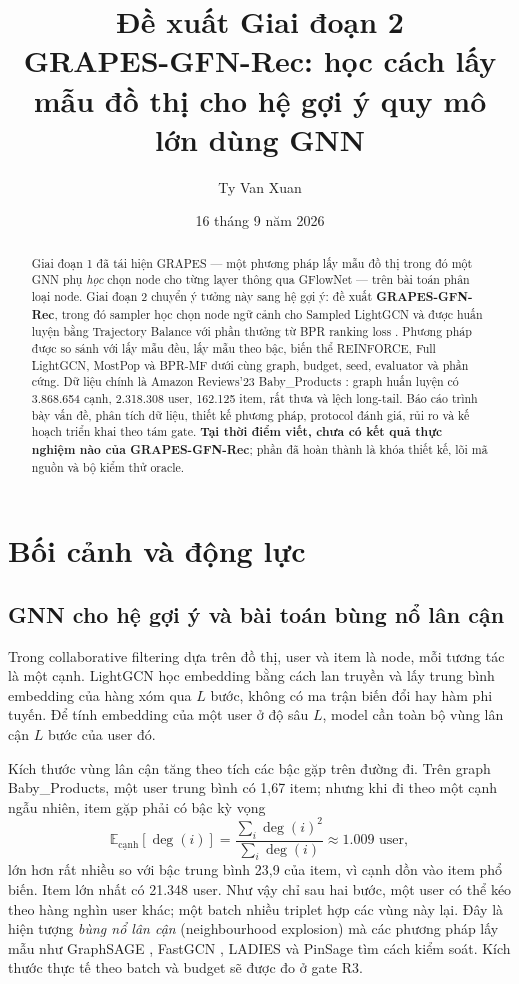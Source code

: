 \documentclass[11pt,a4paper]{article}
\title{\textbf{Đề xuất Giai đoạn 2}\\[4pt]\Large GRAPES-GFN-Rec: học cách lấy mẫu đồ thị cho hệ gợi ý quy mô lớn dùng GNN}
\author{Ty Van Xuan}
\date{16 tháng 9 năm 2026}
\begin{document}
\maketitle

\begin{abstract}
\noindent Giai đoạn 1 đã tái hiện GRAPES \cite{grapes} — một phương pháp lấy mẫu đồ thị trong đó một GNN phụ \emph{học} chọn node cho từng layer thông qua GFlowNet — trên bài toán phân loại node. Giai đoạn 2 chuyển ý tưởng này sang hệ gợi ý: đề xuất \textbf{GRAPES-GFN-Rec}, trong đó sampler học chọn node ngữ cảnh cho Sampled LightGCN \cite{lightgcn} và được huấn luyện bằng Trajectory Balance \cite{tb} với phần thưởng từ BPR ranking loss \cite{bpr}. Phương pháp được so sánh với lấy mẫu đều, lấy mẫu theo bậc, biến thể REINFORCE, Full LightGCN, MostPop và BPR-MF dưới cùng graph, budget, seed, evaluator và phần cứng. Dữ liệu chính là Amazon Reviews'23 Baby\_Products \cite{amazon23}: graph huấn luyện có 3.868.654 cạnh, 2.318.308 user, 162.125 item, rất thưa và lệch long-tail. Báo cáo trình bày vấn đề, phân tích dữ liệu, thiết kế phương pháp, protocol đánh giá, rủi ro và kế hoạch triển khai theo tám gate. \textbf{Tại thời điểm viết, chưa có kết quả thực nghiệm nào của GRAPES-GFN-Rec}; phần đã hoàn thành là khóa thiết kế, lõi mã nguồn và bộ kiểm thử oracle.
\end{abstract}

\tableofcontents
\newpage

\section{Bối cảnh và động lực}

\subsection{GNN cho hệ gợi ý và bài toán bùng nổ lân cận}
Trong collaborative filtering dựa trên đồ thị, user và item là node, mỗi tương tác là một cạnh. LightGCN \cite{lightgcn} học embedding bằng cách lan truyền và lấy trung bình embedding của hàng xóm qua $L$ bước, không có ma trận biến đổi hay hàm phi tuyến. Để tính embedding của một user ở độ sâu $L$, model cần toàn bộ vùng lân cận $L$ bước của user đó.

Kích thước vùng lân cận tăng theo tích các bậc gặp trên đường đi. Trên graph Baby\_Products, một user trung bình có 1,67 item; nhưng khi đi theo một cạnh ngẫu nhiên, item gặp phải có bậc kỳ vọng
\[
  \mathbb{E}_{\text{cạnh}}[\deg(i)] = \frac{\sum_i \deg(i)^2}{\sum_i \deg(i)} \approx 1.009 \text{ user},
\]
lớn hơn rất nhiều so với bậc trung bình 23,9 của item, vì cạnh dồn vào item phổ biến. Item lớn nhất có 21.348 user. Như vậy chỉ sau hai bước, một user có thể kéo theo hàng nghìn user khác; một batch nhiều triplet hợp các vùng này lại. Đây là hiện tượng \emph{bùng nổ lân cận} (neighbourhood explosion) mà các phương pháp lấy mẫu như GraphSAGE \cite{graphsage}, FastGCN \cite{fastgcn}, LADIES \cite{ladies} và PinSage \cite{pinsage} tìm cách kiểm soát. Kích thước thực tế theo batch và budget sẽ được đo ở gate R3.
\end{document}
